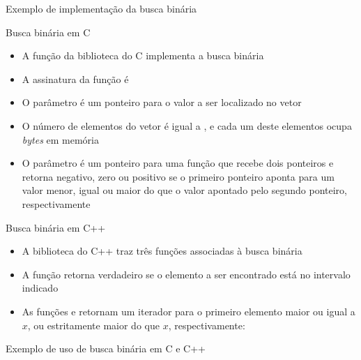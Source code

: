 \begin{frame}[fragile]{Exemplo de implementação da busca binária}
\end{frame}

\begin{frame}[fragile]{Busca binária em C}

    \begin{itemize}
		\item A função  da biblioteca  do C implementa a busca 
        binária

        \item A assinatura da função  é

        \item O parâmetro  é um ponteiro para o valor a ser localizado no
            vetor 

        \item O número de elementos do vetor  é igual a , e 
            cada um deste elementos ocupa  \textit{bytes} em memória

        \item O parâmetro  é um ponteiro para uma função que recebe dois
            ponteiros e retorna negativo, zero ou positivo se o primeiro ponteiro aponta para
            um valor menor, igual ou maior do que o valor apontado pelo segundo ponteiro,
            respectivamente
    \end{itemize}

\end{frame}

\begin{frame}[fragile]{Busca binária em C++}

    \begin{itemize}
        \item A biblioteca  do C++ traz três funções associadas à busca
            binária

        \item A função  retorna verdadeiro se o elemento a ser
        encontrado está no intervalo indicado

        \item As funções  e  retornam um iterador
        para o primeiro elemento maior ou igual a $x$, ou estritamente maior do que $x$, 
        respectivamente:

    \end{itemize}

\end{frame}
\begin{frame}[fragile]{Exemplo de uso de busca binária em C e C++}
\end{frame}

